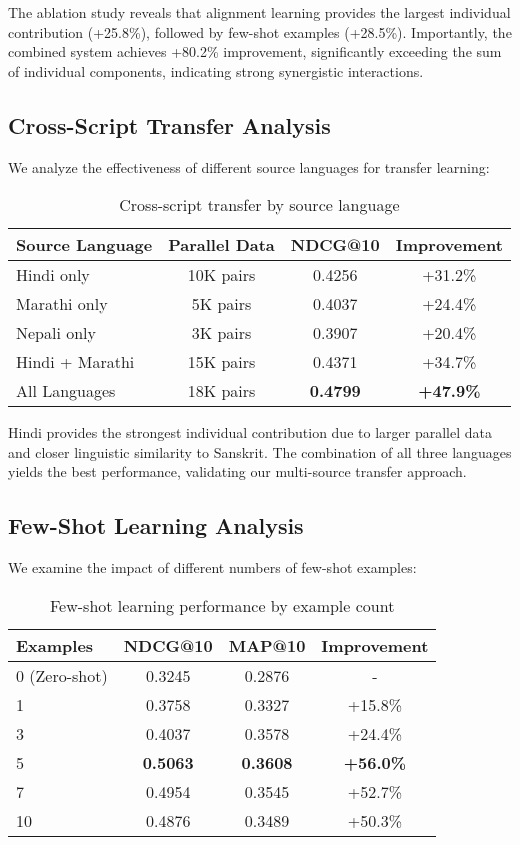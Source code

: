 \documentclass[runningheads]{llncs}
\begin{document}
The ablation study reveals that alignment learning provides the largest individual contribution (+25.8\%), followed by few-shot examples (+28.5\%). Importantly, the combined system achieves +80.2\% improvement, significantly exceeding the sum of individual components, indicating strong synergistic interactions.

\subsection{Cross-Script Transfer Analysis}

We analyze the effectiveness of different source languages for transfer learning:

\begin{table}
\caption{Cross-script transfer by source language}\label{tab:transfer}
\begin{tabular}{lccc}
\toprule
\textbf{Source Language} & \textbf{Parallel Data} & \textbf{NDCG@10} & \textbf{Improvement} \\
\midrule
Hindi only & 10K pairs & 0.4256 & +31.2\% \\
Marathi only & 5K pairs & 0.4037 & +24.4\% \\
Nepali only & 3K pairs & 0.3907 & +20.4\% \\
Hindi + Marathi & 15K pairs & 0.4371 & +34.7\% \\
All Languages & 18K pairs & \textbf{0.4799} & \textbf{+47.9\%} \\
\bottomrule
\end{tabular}
\end{table}

Hindi provides the strongest individual contribution due to larger parallel data and closer linguistic similarity to Sanskrit. The combination of all three languages yields the best performance, validating our multi-source transfer approach.

\subsection{Few-Shot Learning Analysis}

We examine the impact of different numbers of few-shot examples:

\begin{table}
\caption{Few-shot learning performance by example count}\label{tab:fewshot}
\begin{tabular}{lccc}
\toprule
\textbf{Examples} & \textbf{NDCG@10} & \textbf{MAP@10} & \textbf{Improvement} \\
\midrule
0 (Zero-shot) & 0.3245 & 0.2876 & - \\
1 & 0.3758 & 0.3327 & +15.8\% \\
3 & 0.4037 & 0.3578 & +24.4\% \\
5 & \textbf{0.5063} & \textbf{0.3608} & \textbf{+56.0\%} \\
7 & 0.4954 & 0.3545 & +52.7\% \\
10 & 0.4876 & 0.3489 & +50.3\% \\
\bottomrule
\end{tabular}
\end{table}
\end{document}
